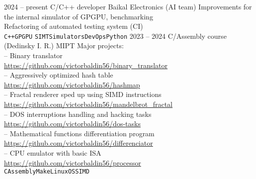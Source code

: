 \documentclass[9pt]{developercv} %
\begin{document}
\begin{entrylist}
        \entry
                {2024 -- present}
                {C/C++ developer}
                {Baikal Electronics (AI team)}
                {Improvements for the internal simulator of GPGPU, benchmarking\\
                 Refactoring of automated testing system (CI)\\
                  \texttt{C++}\slashsep\texttt{GPGPU}
                  \slashsep\texttt{SIMT}\slashsep\texttt{Simulators}\slashsep\texttt{DevOps}\slashsep\texttt{Python}}
        \entry
                {2023 -- 2024}
                {C/Assembly course (Dedinsky I. R.)}
                {MIPT}
                {Major projects:\\
                 -- Binary translator\\
                 \url{https://github.com/victorbaldin56/binary_translator}\\
                 -- Aggressively optimized hash table\\
                 \url{https://github.com/victorbaldin56/hashmap}\\
                 -- Fractal renderer sped up using SIMD instructions\\
                 \url{https://github.com/victorbaldin56/mandelbrot_fractal}\\
                 -- DOS interruptions handling and hacking tasks\\
                 \url{https://github.com/victorbaldin56/dos-tasks}\\
                 -- Mathematical functions differentiation program\\
                 \url{https://github.com/victorbaldin56/differenciator}\\
                 -- CPU emulator with basic ISA\\
                 \url{https://github.com/victorbaldin56/processor}\\
                 \texttt{C}\slashsep\texttt{Assembly}\slashsep\texttt{Make}\slashsep\texttt{Linux}\slashsep\texttt{OS}\slashsep\texttt{SIMD}}

\end{entrylist}
\end{document}
